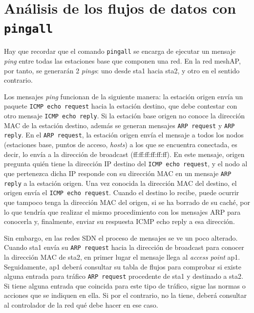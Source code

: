 \documentclass[a4paper,12pt,twoside,spanish]{book}
\begin{document}
\section{Análisis de los flujos de datos con \texttt{pingall}}\label{sect:tablas_flujos}


Hay que recordar que el comando \texttt{pingall} se encarga de ejecutar un mensaje \textit{ping} entre todas las estaciones base que componen una red. En la red meshAP, por tanto, se generarán 2 \textit{pings}: uno desde sta1 hacia sta2, y otro en el sentido contrario.\par

Los mensajes \textit{ping} funcionan de la siguiente manera: la estación origen envía un paquete \texttt{ICMP echo request} hacia la estación destino, que debe contestar con otro mensaje \texttt{ICMP echo reply}. Si la estación base origen no conoce la dirección MAC de la estación destino, además se generan mensajes \texttt{ARP request} y \texttt{ARP reply}. En el \texttt{ARP request}, la estación origen envía el mensaje a todos los nodos (estaciones base, puntos de acceso, \textit{hosts}) a los que se encuentra conectada, es decir, lo envía a la dirección de broadcast (ff:ff:ff:ff:ff:ff). En este mensaje, origen pregunta quién tiene la dirección IP destino del \texttt{ICMP echo request}, y el nodo al que pertenezca dicha IP responde con su dirección MAC en un mensaje \texttt{ARP reply} a la estación origen. Una vez conocida la dirección MAC del destino, el origen envía el \texttt{ICMP echo request}. Cuando el destino lo recibe, puede ocurrir que tampoco tenga la dirección MAC del origen, si se ha borrado de su caché, por lo que tendría que realizar el mismo procedimiento con los mensajes ARP para conocerla y, finalmente, enviar su respuesta ICMP echo reply a esa dirección.\par

Sin embargo, en las redes SDN el proceso de mensajes se ve un poco alterado. Cuando sta1 envía su \texttt{ARP request} hacia la dirección de broadcast para conocer la dirección MAC de sta2, en primer lugar el mensaje llega al \textit{access point} ap1. Seguidamente, ap1 deberá consultar su tabla de flujos para comprobar si existe alguna entrada para tráfico \texttt{ARP request} procedente de sta1 y destinado a sta2. Si tiene alguna entrada que coincida para este tipo de tráfico, sigue las normas o acciones que se indiquen en ella. Si por el contrario, no la tiene, deberá consultar al controlador de la red qué debe hacer en ese caso.\par 
\end{document}
